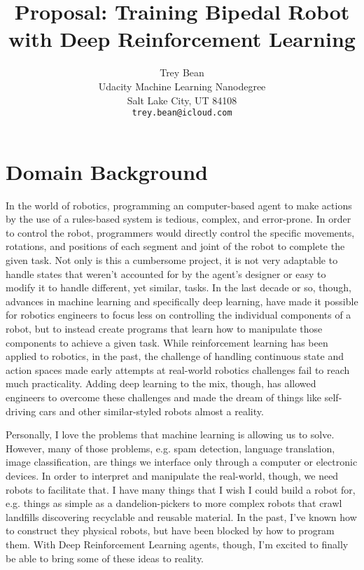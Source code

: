 \documentclass{article}
\title{Proposal: Training Bipedal Robot with Deep Reinforcement Learning}
\author{
  Trey Bean \\
  Udacity Machine Learning Nanodegree\\
  Salt Lake City, UT 84108 \\
  \texttt{trey.bean@icloud.com} \\
}
\begin{document}
\maketitle





\section{Domain Background}
\label{sec:background}
In the world of robotics, programming an computer-based agent to make actions by the use of a rules-based system is tedious, complex, and error-prone. In order to control the robot, programmers would directly control the specific movements, rotations, and positions of each segment and joint of the robot to complete the given task. Not only is this a cumbersome project, it is not very adaptable to handle states that weren't accounted for by the agent's designer or easy to modify it to handle different, yet similar, tasks. In the last decade or so, though, advances in machine learning and specifically deep learning, have made it possible for robotics engineers to focus less on controlling the individual components of a robot, but to instead create programs that learn how to manipulate those components to achieve a given task. While reinforcement learning has been applied to robotics, in the past, the challenge of handling continuous state and action spaces made early attempts at real-world robotics challenges fail to reach much practicality. Adding deep learning to the mix, though, has allowed engineers to overcome these challenges and made the dream of things like self-driving cars and other similar-styled robots almost a reality. 

Personally, I love the problems that machine learning is allowing us to solve. However, many of those problems, e.g. spam detection, language translation, image classification, are things we interface only through a computer or electronic devices. In order to interpret and manipulate the real-world, though, we need robots to facilitate that. I have many things that I wish I could build a robot for, e.g. things as simple as a dandelion-pickers to more complex robots that crawl landfills discovering recyclable and reusable material. In the past, I've known how to construct they physical robots, but have been blocked by how to program them. With Deep Reinforcement Learning agents, though, I'm excited to finally be able to bring some of these ideas to reality.
\end{document}
